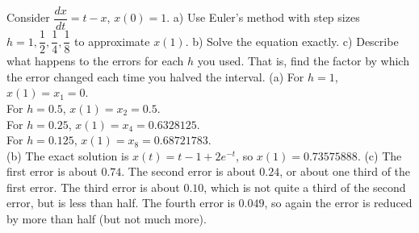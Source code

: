 {Consider $\dfrac{dx}{dt} = t-x$, $x(0)=1$.  a) Use Euler's method
with step sizes $h = 1, \dfrac{1}{2}, \dfrac{1}{4}, \dfrac{1}{8}$ to
approximate
$x(1)$.  b) Solve the equation exactly.
c) Describe what happens to the
errors for each $h$ you used.  That is, find the factor by which the error
changed each time you halved the interval.}
{(a) For $h=1$, $x(1) = x_1 = 0$.\\
For $h=0.5$, $x(1) = x_2 = 0.5$.\\
For $h=0.25$, $x(1) = x_4 = 0.6328125$.\\
For $h=0.125$, $x(1) = x_8 = 0.68721783$.\\
(b) The exact solution is $x(t) = t-1+2e^{-t}$, so $x(1) = 0.73575888$.
(c) The first error is about $0.74$. The second error is about $0.24$, or about one third of the first error. The third error is about $0.10$, which is not quite a third of the second error, but is less than half. The fourth error is $0.049$, so again the error is reduced by more than half (but not much more).}